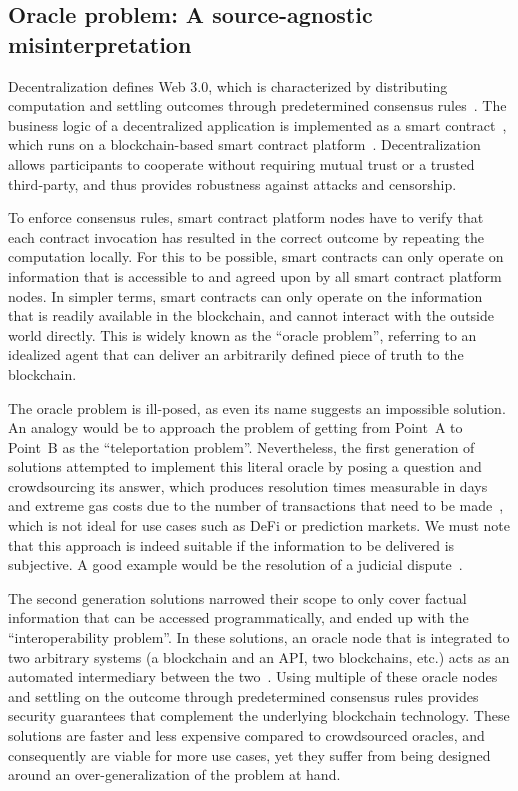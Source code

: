 \documentclass[11pt]{article}
\begin{document}
\subsection{Oracle problem: A source-agnostic misinterpretation}
\label{sec:oracle-problem-a-misnomer}

Decentralization defines Web 3.0, which is characterized by distributing computation and settling outcomes through predetermined consensus rules~\cite{nakamoto:2009}.
The business logic of a decentralized application is implemented as a smart contract~\cite{szabo:1994}, which runs on a blockchain-based smart contract platform~\cite{buterin:2014a}.
Decentralization allows participants to cooperate without requiring mutual trust or a trusted third-party, and thus provides robustness against attacks and censorship.

To enforce consensus rules, smart contract platform nodes have to verify that each contract invocation has resulted in the correct outcome by repeating the computation locally.
For this to be possible, smart contracts can only operate on information that is accessible to and agreed upon by all smart contract platform nodes.
In simpler terms, smart contracts can only operate on the information that is readily available in the blockchain, and cannot interact with the outside world directly.
This is widely known as the ``oracle problem'', referring to an idealized agent that can deliver an arbitrarily defined piece of truth to the blockchain.

The oracle problem is ill-posed, as even its name suggests an impossible solution.
An analogy would be to approach the problem of getting from Point~A to Point~B as the ``teleportation problem''.
Nevertheless, the first generation of solutions attempted to implement this literal oracle by posing a question and crowdsourcing its answer, which produces resolution times measurable in days and extreme gas costs due to the number of transactions that need to be made~\cite{augur:2019}, which is not ideal for use cases such as DeFi or prediction markets.
We must note that this approach is indeed suitable if the information to be delivered is subjective.
A good example would be the resolution of a judicial dispute~\cite{kleros:2019}.

The second generation solutions narrowed their scope to only cover factual information that can be accessed programmatically, and ended up with the ``interoperability problem''.
In these solutions, an oracle node that is integrated to two arbitrary systems (a blockchain and an API, two blockchains, etc.) acts as an automated intermediary between the two~\cite{ellis:2017,band,depedro:2017,tellor}.
Using multiple of these oracle nodes and settling on the outcome through predetermined consensus rules provides security guarantees that complement the underlying blockchain technology.
These solutions are faster and less expensive compared to crowdsourced oracles, and consequently are viable for more use cases, yet they suffer from being designed around an over-generalization of the problem at hand.
\end{document}
